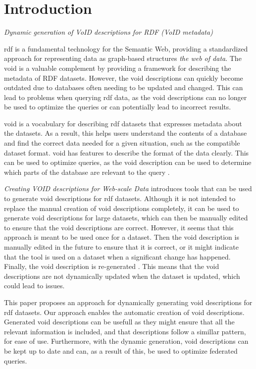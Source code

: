 \section{Introduction}\label{sec:introduction2}
\emph{Dynamic generation of VoID descriptions for RDF (VoID metadata)}

\gls{rdf} is a fundamental technology for the Semantic Web, providing a standardized approach for representing data as graph-based structures \emph{the web of data}. The \gls{void} is a valuable complement by providing a framework for describing the metadata of RDF datasets. However, the \gls{void} descriptions can quickly become outdated due to databases often needing to be updated and changed. This can lead to problems when querying \gls{rdf} data, as the \gls{void} descriptions can no longer be used to optimize the queries or can potentially lead to incorrect results.

\gls{void} is a vocabulary for describing \gls{rdf} datasets that expresses metadata about the datasets. As a result, this helps users understand the contents of a database and find the correct data needed for a given situation, such as the compatible dataset format. \gls{void} has features to describe the format of the data clearly. This can be used to optimize queries, as the \gls{void} description can be used to determine which parts of the database are relevant to the query .

\emph{Creating VOID descriptions for Web-scale Data} introduces tools that can be used to generate \gls{void} descriptions for \gls{rdf} datasets. Although it is not intended to replace the manual creation of \gls{void} descriptions completely, it can be used to generate \gls{void} descriptions for large datasets, which can then be manually edited to ensure that the \gls{void} descriptions are correct. However, it seems that this approach is meant to be used once for a dataset. Then the \gls{void} description is manually edited in the future to ensure that it is correct, or it might indicate that the tool is used on a dataset when a significant change has happened. Finally, the \gls{void} description is re-generated . This means that the \gls{void} descriptions are not dynamically updated when the dataset is updated, which could lead to issues.

This paper proposes an approach for dynamically generating \gls{void} descriptions for \gls{rdf} datasets. Our approach enables the automatic creation of \gls{void} descriptions. Generated \gls{void} descriptions can be usefull as they might ensure that all the relevant information is included, and that descriptions follow a simillar pattern, for ease of use. Furthermore, with the dynamic generation, \gls{void} descriptions can be kept up to date and can, as a result of this, be used to optimize federated queries.



